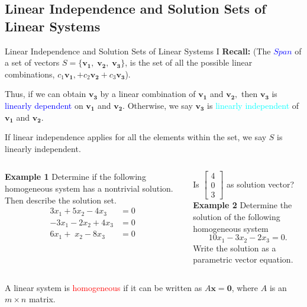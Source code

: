\documentclass[10pt, aspectratio=169]{beamer}
\begin{document}
\subsection{Linear Independence and Solution Sets of Linear Systems}
\begin{frame}{Linear Independence and Solution Sets of Linear Systems I}
    \textbf{Recall:} (The \textcolor{blue}{\(Span\)} of a set of vectors \(S=\{\mathbf{v_1}, \; \mathbf{v_2}, \; \mathbf{v_3}\}\), is the set of all the possible linear combinations, \(c_1\mathbf{v_1}, +c_2\mathbf{v_2}+c_3\mathbf{v_3}\)).
    
    Thus, if we can obtain \(\mathbf{v_3}\) by a linear combination of \(\mathbf{v_1}\) and \(\mathbf{v_2},\) then \(\mathbf{v_3}\) is \textcolor{blue}{linearly dependent} on \(\mathbf{v_1}\) and \(\mathbf{v_2}\).
    Otherwise, we say \(\mathbf{v_3}\) is \textcolor{cyan}{linearly independent} of \(\mathbf{v_1}\) and \(\mathbf{v_2}\).

    If linear independence applies for all the elements within the set, we say \(S\) is linearly independent.
    
    \vspace{0.15cm}
    
    \begin{columns}
        \begin{column}{0.5\textwidth}
            \textbf{Example 1} Determine if the following homogeneous system has a nontrivial solution. Then describe the solution set.
            \begin{align*}
                3x_1 + 5x_2 -4x_3 &= 0\\
                -3x_1 - 2x_2 +4x_3 &= 0\\
                6x_1 + \;x_2 -8x_3 &= 0
            \end{align*}
        \end{column}

        \begin{column}{0.5\textwidth}
             Is 
             \(\begin{bmatrix}
                4\\
                0\\
                3
            \end{bmatrix}\) as solution vector?\\
            
            \textbf{Example 2} Determine the solution of the following homogeneous system
            \[10x_1 -3x_2 - 2x_3 = 0.\]
            Write the solution as a parametric vector equation.
        \end{column}
    \end{columns}
    
    \vspace{0.15cm}
    
    A linear system is \textcolor{red}{homogeneous} if it can be written as \(A\mathbf{x}=\mathbf{0}\), where \(A\) is an \(m\times n\) matrix.
\end{frame}
\end{document}
